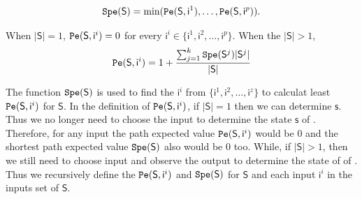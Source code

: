 \begin{definition} \label{lspe}
\begin{equation}
\begin{split}
{\tt Spe}(\mathsf{S})= \min({\tt Pe}(\mathsf{S}, \mathsf{ i}^{1}),\ldots,{\tt Pe}(\mathsf{S}, \mathsf{ i}^{p})).
\end{split}
\end{equation}
\end{definition}

\begin{definition} \label{spe}

When $|\mathsf{S}|=1$,
${\tt Pe}(\mathsf{S}, \mathsf{ i}^{i})=0$  for every $\mathsf{ i}^{i} \in \{\mathsf{ i}^{1},\mathsf{ i}^{2},\ldots, \mathsf{ i}^{p}\}$. %
When the $|\mathsf{S}|>1$, 
\begin{equation}
\begin{split}
{\tt Pe}(\mathsf{S}, \mathsf{ i}^{i})=1 +\frac{\sum_{j=1}^k {\tt Spe}(\mathsf{S}^{j})|\mathsf{S}^{j}|}{ |\mathsf{S}|}
\end{split}
\end{equation}
\end{definition}

The function ${\tt Spe}(\mathsf{S})$ is used to find the $\mathsf{ i}^{i}$ from $\{\mathsf{ i}^{1},\mathsf{ i}^{2},\ldots, \mathsf{ i}^{z}\}$ to calculat least ${\tt Pe}(\mathsf{S}, \mathsf{ i}^{i})$ for $\mathsf{S}$. In the definition of ${\tt Pe}(\mathsf{S}, \mathsf{ i}^{i})$, if $|\mathsf{S}|=1$ then we can determine $\mathsf{s}$. Thus we no longer need to choose the input to determine the state $\mathsf{s}$ of \BCNs. Therefore, for any input the path expected value ${\tt Pe}(\mathsf{S}, \mathsf{ i}^{i})$ would be $0$ and the shortest path expected value ${\tt Spe}(\mathsf{S})$ also would be $0$ too. While, if $|\mathsf{S}|>1$, then we still need to choose input and observe the output to determine the state of of \BCNs. Thus we recursively define the ${\tt Pe}(\mathsf{S}, \mathsf{ i}^{i})$ and ${\tt Spe}(\mathsf{S})$ for $\mathsf{S}$ and each input $\mathsf{ i}^{i}$ in the inputs set of $\mathsf{S}$. 

